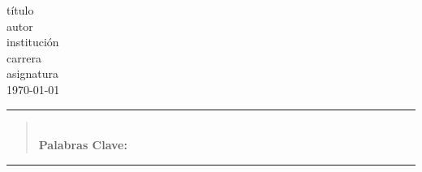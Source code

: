 \documentclass[11pt,letterpaper]{article} 	%
\newcommand{\autor}{autor}
\newcommand{\institucion}{institución}
\newcommand{\carrera}{carrera}
\newcommand{\materia}{asignatura}
\newcommand{\fecha}{\today}
\newcommand{\titulo}{título}
\begin{document}
\begin{titlepage}
    \begin{center}
        {\Huge  \titulo} 		\\[4cm]
        {\large \autor} 			\\
        {\large \institucion} 	\\
        {\large \carrera} 		\\
        {\large \materia} 		\\
        {\large \fecha} 			\\
        \vfill
    \end{center}
    
\begin{center}\rule{0.9\textwidth}{0.1mm} \end{center}
\begin{abstract}
\blindtext \\
{\bf Palabras Clave: } %
\end{abstract}    
\begin{center}\rule{0.9\textwidth}{0.1mm} \end{center}
\end{titlepage}

\blinddocument
\end{document}
